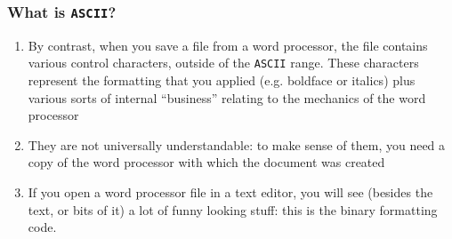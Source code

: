 \documentclass[10pt]{beamer}
\newcounter{saveenumi}
\newcommand{\conti}{\setcounter{enumi}{\value{saveenumi}}}
\begin{document}
\begin{frame}\frametitle{What is \texttt{ASCII}?}

\begin{enumerate}
\conti
\item By contrast, when you save a file from a word processor, the file contains various control characters, outside of the \texttt{ASCII} range. These characters represent the formatting that you applied (e.g.  boldface or italics) plus various sorts of internal ``business'' relating to the mechanics of the word processor
\item They are not universally understandable: to make sense of them, you need a copy of the word processor with which the document was created
\item If you open a word processor file in a text editor, you will see (besides the text, or bits of it) a lot of funny looking stuff: this is the binary formatting code.
\end{enumerate}

\end{frame} 
\end{document}
